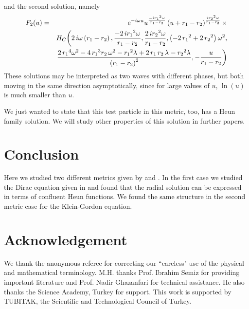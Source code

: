 \documentclass{article}
\begin{document}
and the second solution, namely
\begin{eqnarray}
F_2(u)&=&{{\rm e}^{-i\omega u}} {u}^{{\frac {-i{{r_1}}^{2} \omega}{{r_1}-{r_2}}}} \left(
u+{r_1}-{r_2} \right) ^{{\frac {i{{r_2}}^{2} \omega}{{r_1}-{r_2}}}} \times \\ \nonumber
&& {H_C} \bigg( 2\,i\omega \left( {r_1}-{r_2}
 \right) ,{\frac {-2\,i{{r_1}}^{2} \omega}{{r_1}-{r_2}}},{\frac {2
\,i{{r_2}}^{2}\omega}{{r_1}-{r_2}}}, \left(-2\,{{r_1}}^{2}+2
\,{{r_2}}^{2} \right) {\omega}^{2}, \\ \nonumber &&{\frac
{2\,{{r_1}}^{4}{\omega}^{2}-4\,{
{r_1}}^{3}{r_2}\,{\omega}^{2}-{{r_1}}^{2}{\lambda}_{{}}+2\,{r_1}\,{r_2}\,{\lambda}_{{}}-{{r_2}}^{2}{\lambda}_{{}}}{
\left( {r_1}-{r_2} \right) ^{2}}},-{\frac {u}{{r_1}-{r_2}}} \bigg)
\nonumber
\end{eqnarray}
These solutions  may be interpreted as two waves with different
phases, but both moving in the same direction asymptotically,
since  for large values of $u$, $\ln(u)$ is much smaller than $u$.

We just wanted to state that this test particle in this metric,
too, has a Heun family solution. We will study other properties
of this solution  in further papers.
\section{Conclusion}
Here we studied two different metrics given by \cite{Halil} and \cite{halilbadawi}.
In the first case we studied the Dirac equation given
in \cite{Badawi} and found that the radial solution can be expressed in terms of confluent Heun functions.
We found the same structure in the second metric case \cite{Badawi2, halilbadawi} for the Klein-Gordon equation.

\section{ Acknowledgement} We thank the anonymous referee for correcting our ``careless" use of the physical and mathematical terminology. M.H. thanks  Prof. Ibrahim Semiz for
providing important literature and Prof.  Nadir Ghazanfari for technical assistance. He also thanks the Science Academy, Turkey for support. This work is supported by TUBITAK, the Scientific and Technological Council of Turkey.
\end{document}
